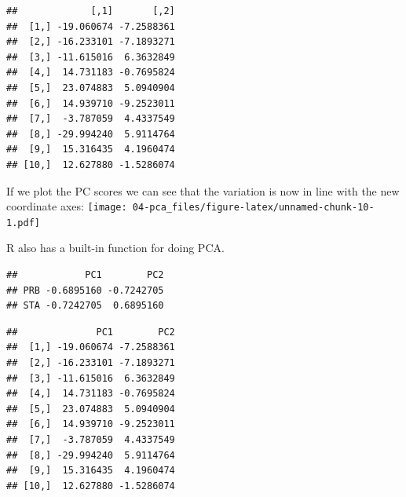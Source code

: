 \documentclass[]{book}
\newenvironment{Shaded}{\begin{snugshade}}{\end{snugshade}}
\newcommand{\CommentTok}[1]{\textcolor[rgb]{0.56,0.35,0.01}{\textit{#1}}}
\newcommand{\DecValTok}[1]{\textcolor[rgb]{0.00,0.00,0.81}{#1}}
\newcommand{\KeywordTok}[1]{\textcolor[rgb]{0.13,0.29,0.53}{\textbf{#1}}}
\newcommand{\NormalTok}[1]{#1}
\newcommand{\OperatorTok}[1]{\textcolor[rgb]{0.81,0.36,0.00}{\textbf{#1}}}
\newcommand{\StringTok}[1]{\textcolor[rgb]{0.31,0.60,0.02}{#1}}
\theoremstyle{definition}
\theoremstyle{definition}
\theoremstyle{definition}
\theoremstyle{remark}
\begin{document}
\begin{Shaded}
\end{Shaded}

\begin{verbatim}
##             [,1]       [,2]
##  [1,] -19.060674 -7.2588361
##  [2,] -16.233101 -7.1893271
##  [3,] -11.615016  6.3632849
##  [4,]  14.731183 -0.7695824
##  [5,]  23.074883  5.0940904
##  [6,]  14.939710 -9.2523011
##  [7,]  -3.787059  4.4337549
##  [8,] -29.994240  5.9114764
##  [9,]  15.316435  4.1960474
## [10,]  12.627880 -1.5286074
\end{verbatim}

If we plot the PC scores we can see that the variation is now in line with the new coordinate axes:
\texttt{[image: 04-pca\_files/figure-latex/unnamed-chunk-10-1.pdf]}

R also has a built-in function for doing PCA.

\begin{Shaded}
\end{Shaded}

\begin{verbatim}
##            PC1        PC2
## PRB -0.6895160 -0.7242705
## STA -0.7242705  0.6895160
\end{verbatim}

\begin{Shaded}
\end{Shaded}

\begin{verbatim}
##              PC1        PC2
##  [1,] -19.060674 -7.2588361
##  [2,] -16.233101 -7.1893271
##  [3,] -11.615016  6.3632849
##  [4,]  14.731183 -0.7695824
##  [5,]  23.074883  5.0940904
##  [6,]  14.939710 -9.2523011
##  [7,]  -3.787059  4.4337549
##  [8,] -29.994240  5.9114764
##  [9,]  15.316435  4.1960474
## [10,]  12.627880 -1.5286074
\end{verbatim}
\end{document}
